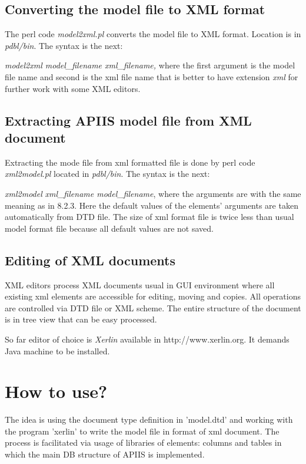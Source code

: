 \subsection{Converting the model file to XML format}

The perl code \emph{model2xml.pl} converts the model file to XML format.
Location is in \emph{pdbl/bin}. The syntax is the next:

\emph{model2xml model\_filename xml\_filename,} where the first argument
is the model file name and second is the xml file name that is better
to have extension \emph{xml} for further work with some XML editors. 


\subsection{Extracting APIIS model file from XML document }

Extracting the mode file from xml formatted file is done by perl code
\emph{xml2model}.\emph{pl} located in \emph{pdbl/bin}. The syntax
is the next:

\emph{xml2model} \emph{xml\_filename model\_filename}, where the arguments
are with the same meaning as in 8.2.3. Here the default values of
the elements' arguments are taken automatically from DTD file. The
size of xml format file is twice less than usual model format file
because all default values are not saved.


\subsection{Editing of XML documents }

XML editors process XML documents usual in GUI environment where all
existing xml elements are accessible for editing, moving and copies.
All operations are controlled via DTD file or XML scheme. The entire
structure of the document is in tree view that can be easy processed. 

So far editor of choice is \emph{Xerlin} available in http://www.xerlin.org.
It demands Java machine to be installed. 


\section{How to use? }

The idea is using the document type definition in 'model.dtd' and
working with the program 'xerlin' to write the model file in format
of xml document. The process is facilitated via usage of libraries
of elements: columns and tables in which the main DB structure of
APIIS is implemented. 


